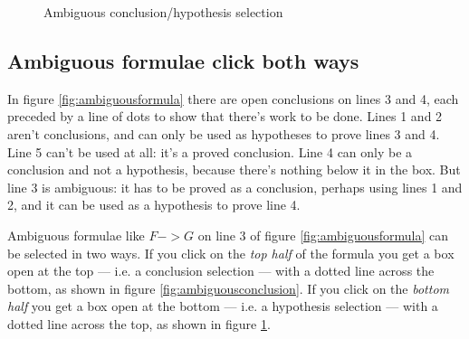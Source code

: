 \documentclass[11pt]{book}
\newcommand{\figref}[1]{figure \ref{fig:#1}}
\begin{document}
\begin{figure}
{  \label{fig:ambiguoushypothesis}
  \parbox[b]{130pt}{\centering{}}}
\caption{Ambiguous conclusion/hypothesis selection}
\end{figure}

\subsection{Ambiguous formulae click both ways}

In \figref{ambiguousformula} there are open conclusions on lines 3 and 4, each preceded by a line of dots to show that there's work to be done. Lines 1 and 2 aren't conclusions, and can only be used as hypotheses to prove lines 3 and 4. Line 5 can't be used at all: it's a proved conclusion. Line 4 can only be a conclusion and not a hypothesis, because there's nothing below it in the box. But line 3 is ambiguous: it has to be proved as a conclusion, perhaps using lines 1 and 2, and it can be used as a hypothesis to prove line 4. 

Ambiguous formulae like $F->G$ on line 3 of \figref{ambiguousformula} can be selected in two ways. If you click on the \emph{top half} of the formula you get a box open at the top --- i.e. a conclusion selection --- with a dotted line across the bottom, as shown in \figref{ambiguousconclusion}. If you click on the \emph{bottom half} you get a box open at the bottom --- i.e. a hypothesis selection --- with a dotted line across the top, as shown in \figref{ambiguoushypothesis}.
\end{document}
